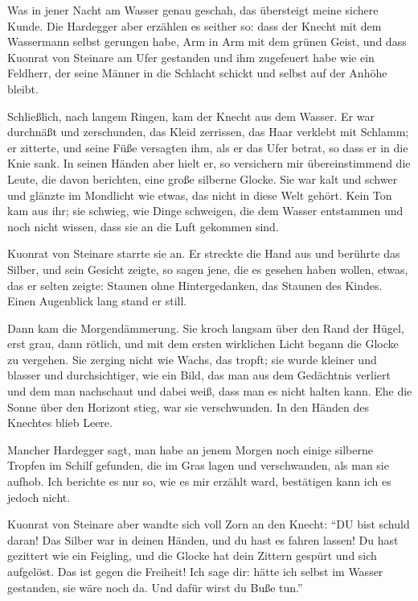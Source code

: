 Was in jener Nacht am Wasser genau geschah, das übersteigt meine sichere Kunde. Die Hardegger aber erzählen es seither so: dass der \gls{Knecht} mit dem Wassermann selbst gerungen habe, Arm in Arm mit dem grünen Geist, und dass \gls{Kuonrat von Steinare} am Ufer gestanden und ihm zugefeuert habe wie ein Feldherr, der seine Männer in die Schlacht schickt und selbst auf der Anhöhe bleibt.

Schließlich, nach langem Ringen, kam der \gls{Knecht} aus dem Wasser. Er war durchnäßt und zerschunden, das Kleid zerrissen, das Haar verklebt mit Schlamm; er zitterte, und seine Füße versagten ihm, als er das Ufer betrat, so dass er in die Knie sank. In seinen Händen aber hielt er, so versichern mir übereinstimmend die Leute, die davon berichten, eine große silberne Glocke. Sie war kalt und schwer und glänzte im Mondlicht wie etwas, das nicht in diese Welt gehört. Kein Ton kam aus ihr; sie schwieg, wie Dinge schweigen, die dem Wasser entstammen und noch nicht wissen, dass sie an die Luft gekommen sind.

\gls{Kuonrat von Steinare} starrte sie an. Er streckte die Hand aus und berührte das Silber, und sein Gesicht zeigte, so sagen jene, die es gesehen haben wollen, etwas, das er selten zeigte: Staunen ohne Hintergedanken, das Staunen des Kindes. Einen Augenblick lang stand er still.

Dann kam die Morgendämmerung. Sie kroch langsam über den Rand der Hügel, erst grau, dann rötlich, und mit dem ersten wirklichen Licht begann die Glocke zu vergehen. Sie zerging nicht wie Wachs, das tropft; sie wurde kleiner und blasser und durchsichtiger, wie ein Bild, das man aus dem Gedächtnis verliert und dem man nachschaut und dabei weiß, dass man es nicht halten kann. Ehe die Sonne über den Horizont stieg, war sie verschwunden. In den Händen des \gls{Knecht}es blieb Leere.

Mancher Hardegger sagt, man habe an jenem Morgen noch einige silberne Tropfen im Schilf gefunden, die im Gras lagen und verschwanden, als man sie aufhob. Ich berichte es nur so, wie es mir erzählt ward, bestätigen kann ich es jedoch nicht.

\gls{Kuonrat von Steinare} aber wandte sich voll Zorn an den Knecht: \enquote{DU bist schuld daran! Das Silber war in deinen Händen, und du hast es fahren lassen! Du hast gezittert wie ein Feigling, und die Glocke hat dein Zittern gespürt und sich aufgelöst. Das ist gegen die \gls{Freiheit}! Ich sage dir: hätte ich selbst im Wasser gestanden, sie wäre noch da. Und dafür wirst du Buße tun.}

